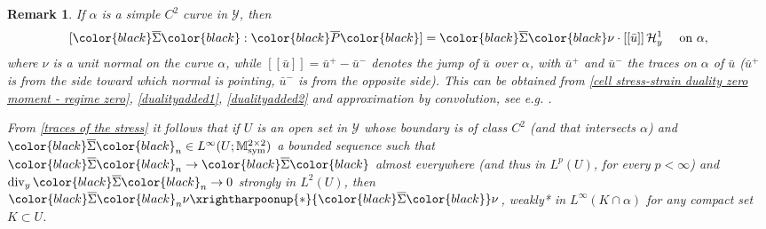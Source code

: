 \documentclass[reqno,10pt]{amsart}
\numberwithin{equation}{section}
\newtheorem{remark}[theorem]{Remark}
\theoremstyle{remark}
\newcommand{\BLACK}{\color{black}}
\newcommand{\PINK}{\color{black}}
\newcommand{\calH}{\mathcal{H}}
\newcommand{\calY}{\mathcal{Y}}
\DeclareMathOperator{\sym}{sym}
\newcommand{\weakstar}{\xrightharpoonup{*}}
\renewcommand{\div}{\operatorname{div}}
\newcommand{\zerothI}[1]{\overline{#1}}
\begin{document}
\begin{remark} \label{remadd1}
If $\alpha$ is a simple $C^2$ curve in $\calY$, then
\begin{equation} \label{dualityadded3} 
	[{\PINK\zerothI{\Sigma}\BLACK}:{\PINK\zerothI{P}\BLACK}] = {\PINK\zerothI{\Sigma}\BLACK}\nu \cdot [[\bar{u}]] \,\calH^{1}_{y} \quad \textrm{ on } \alpha, 
\end{equation} 
where $\nu$ is a unit normal on the curve $\alpha$, while $[[\bar{u}]] = \bar{u}^{+}-\bar{u}^{-}$ denotes the jump of $\bar{u}$ over $\alpha$, with $\bar{u}^{+}$ and $\bar{u}^{-}$ the traces on $\alpha$ of $\bar{u}$ ($\bar{u}^{+}$ is from the side toward which normal is pointing, $\bar{u}^{-}$ is from the opposite side). This can be obtained from \eqref{cell stress-strain duality zero moment - regime zero}, \eqref{dualityadded1}, \eqref{dualityadded2} and approximation by convolution, see e.g. \cite[Lemma 3.8]{Francfort.Giacomini.2012}. 

From \eqref{traces of the stress} it follows that if $U$ is an open set in $\calY$ whose boundary is of class $C^2$ (and that intersects $\alpha$) and ${\PINK\zerothI{\Sigma}\BLACK}_n \in L^\infty(U;\mathbb{M}_{\sym}^{2 \times 2})$ a bounded sequence such that ${\PINK\zerothI{\Sigma}\BLACK}_n \to {\PINK\zerothI{\Sigma}\BLACK}$ almost everywhere (and thus in $L^p(U)$, for every $p<\infty$) and $\div_y {\PINK\zerothI{\Sigma}\BLACK}_n\to 0$ strongly in $L^2(U)$, then ${\PINK\zerothI{\Sigma}\BLACK}_n \nu \weakstar {\PINK\zerothI{\Sigma}\BLACK}\nu$, weakly* in $L^{\infty}(K \cap \alpha)$ for any compact set $K \subset U$.
\end{remark}
\end{document}
